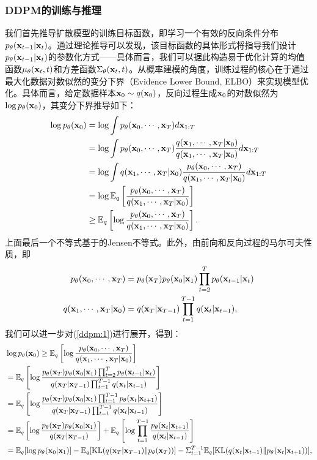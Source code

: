 \documentclass[11pt,a4paper,UTF8]{ctexart}
\begin{document}
\subsubsection{DDPM的训练与推理}

我们首先推导扩散模型的训练目标函数，即学习一个有效的反向条件分布$p_{\theta}(\mathbf{x}_{t-1}|\mathbf{x}_t)$。通过理论推导可以发现，该目标函数的具体形式将指导我们设计$p_{\theta}(\mathbf{x}_{t-1}|\mathbf{x}_t)$的参数化方式——具体而言，我们可以据此构造易于优化计算的均值函数$\mu_{\theta}(\mathbf{x}_t,t)$和方差函数$\Sigma_{\theta}(\mathbf{x}_t,t)$。从概率建模的角度，训练过程的核心在于通过最大化数据对数似然的变分下界（Evidence Lower Bound, ELBO）来实现模型优化。具体而言，给定数据样本$\mathbf{x}_0\sim q(\mathbf{x}_0)$，反向过程生成$\mathbf{x}_0$的对数似然为$\log p_{\theta}(\mathbf{x}_0)$，其变分下界推导如下：
\begin{align}
\begin{split}
    \log p_{\theta}(\mathbf{x}_0) &= \log \int p_{\theta}(\mathbf{x}_0,\cdots,\mathbf{x}_T)d\mathbf{x}_{1:T} \\
    &= \log \int p_{\theta}(\mathbf{x}_0,\cdots,\mathbf{x}_T)\frac{q(\mathbf{x}_1,\cdots,\mathbf{x}_T|\mathbf{x}_0)}{q(\mathbf{x}_1,\cdots,\mathbf{x}_T|\mathbf{x}_0)}d\mathbf{x}_{1:T} \\
    &= \log \int q(\mathbf{x}_1,\cdots,\mathbf{x}_T|\mathbf{x}_0)\frac{p_{\theta}(\mathbf{x}_0,\cdots,\mathbf{x}_T)}{q(\mathbf{x}_1,\cdots,\mathbf{x}_T|\mathbf{x}_0)}d\mathbf{x}_{1:T} \\
    &= \log \mathbb{E}_q \left[\frac{p_{\theta}(\mathbf{x}_0,\cdots,\mathbf{x}_T)}{q(\mathbf{x}_1,\cdots,\mathbf{x}_T|\mathbf{x}_0)}\right] \\
    & \geq \mathbb{E}_q \left[\log \frac{p_{\theta}(\mathbf{x}_0,\cdots,\mathbf{x}_T)}{q(\mathbf{x}_1,\cdots,\mathbf{x}_T|\mathbf{x}_0)}\right].
\end{split}
\label{ddpm:1}
\end{align}
上面最后一个不等式基于的Jensen不等式。此外，由前向和反向过程的马尔可夫性质，即
\begin{align*}
    p_{\theta}(\mathbf{x}_0,\cdots,\mathbf{x}_T) &= p_{\theta}(\mathbf{x}_T)p_{\theta}(\mathbf{x}_0|\mathbf{x}_1)\prod_{t=2}^T p_{\theta}(\mathbf{x}_{t-1}|\mathbf{x}_t) \\
    q(\mathbf{x}_1,\cdots,\mathbf{x}_T|\mathbf{x}_0) &= q(\mathbf{x}_T|\mathbf{x}_{T-1})\prod_{t=1}^{T-1}q(\mathbf{x}_t|\mathbf{x}_{t-1}),
\end{align*}
我们可以进一步对(\ref{ddpm:1})进行展开，得到：
\begin{align}
\begin{split}
    &\log p_{\theta}(\mathbf{x}_0) \geq \mathbb{E}_q \left[\log \frac{p_{\theta}(\mathbf{x}_0,\cdots,\mathbf{x}_T)}{q(\mathbf{x}_1,\cdots,\mathbf{x}_T|\mathbf{x}_0)}\right] \\
    &= \mathbb{E}_q \left[\log\frac{p_{\theta}(\mathbf{x}_T)p_{\theta}(\mathbf{x}_0|\mathbf{x}_1)\prod_{t=2}^T p_{\theta}(\mathbf{x}_{t-1}|\mathbf{x}_t)}{q(\mathbf{x}_T|\mathbf{x}_{T-1})\prod_{t=1}^{T-1}q(\mathbf{x}_t|\mathbf{x}_{t-1})} \right] \\
    &= \mathbb{E}_q \left[\log\frac{p_{\theta}(\mathbf{x}_T)p_{\theta}(\mathbf{x}_0|\mathbf{x}_1)\prod_{t=1}^{T-1} p_{\theta}(\mathbf{x}_{t}|\mathbf{x}_{t+1})}{q(\mathbf{x}_T|\mathbf{x}_{T-1})\prod_{t=1}^{T-1}q(\mathbf{x}_t|\mathbf{x}_{t-1})} \right] \\
    &= \mathbb{E}_q\left[\log\frac{p_{\theta}(\mathbf{x}_T)p_{\theta}(\mathbf{x}_0|\mathbf{x}_1)}{q(\mathbf{x}_T|\mathbf{x}_{T-1})} \right] + \mathbb{E}_q\left[\log\prod_{t=1}^{T-1}\frac{p_{\theta}(\mathbf{x}_{t}|\mathbf{x}_{t+1})}{q(\mathbf{x}_t|\mathbf{x}_{t-1})} \right] \\
    &= \mathbb{E}_q[\log p_{\theta}(\mathbf{x}_0|\mathbf{x}_1)] - \mathbb{E}_q[\text{KL}(q(\mathbf{x}_T|\mathbf{x}_{T-1}) \| p_{\theta}(\mathbf{x}_T))] -\Sigma_{t=1}^{T-1}\mathbb{E}_q[\text{KL}(q(\mathbf{x}_t|\mathbf{x}_{t-1}) \| p_{\theta}(\mathbf{x}_{t}|\mathbf{x}_{t+1}))],
\end{split}
\label{ddpm:2}
\end{align}
\end{document}
